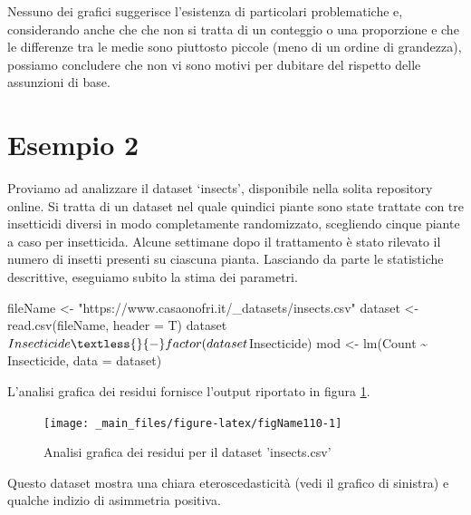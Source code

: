 \documentclass[a4paper,12pt,oneside]{book}
\newenvironment{Shaded}{\begin{snugshade}}{\end{snugshade}}
\newcommand{\SpecialCharTok}[1]{#1}
\newcommand{\StringTok}[1]{#1}
\newcommand{\OtherTok}[1]{#1}
\newcommand{\FunctionTok}[1]{#1}
\newcommand{\AttributeTok}[1]{#1}
\newcommand{\NormalTok}[1]{#1}
\begin{document}
Nessuno dei grafici suggerisce l'esistenza di particolari problematiche e, considerando anche che che non si tratta di un conteggio o una proporzione e che le differenze tra le medie sono piuttosto piccole (meno di un ordine di grandezza), possiamo concludere che non vi sono motivi per dubitare del rispetto delle assunzioni di base.

\hypertarget{esempio-2}{%
\section{Esempio 2}\label{esempio-2}}

Proviamo ad analizzare il dataset `insects', disponibile nella solita repository online. Si tratta di un dataset nel quale quindici piante sono state trattate con tre insetticidi diversi in modo completamente randomizzato, scegliendo cinque piante a caso per insetticida. Alcune settimane dopo il trattamento è stato rilevato il numero di insetti presenti su ciascuna pianta. Lasciando da parte le statistiche descrittive, eseguiamo subito la stima dei parametri.

\begin{Shaded}
\begin{Highlighting}[]
\NormalTok{fileName }\OtherTok{\textless{}{-}} \StringTok{"https://www.casaonofri.it/\_datasets/insects.csv"}
\NormalTok{dataset }\OtherTok{\textless{}{-}} \FunctionTok{read.csv}\NormalTok{(fileName, }\AttributeTok{header =}\NormalTok{ T)}
\NormalTok{dataset}\SpecialCharTok{$}\NormalTok{Insecticide }\OtherTok{\textless{}{-}} \FunctionTok{factor}\NormalTok{(dataset}\SpecialCharTok{$}\NormalTok{Insecticide)}
\NormalTok{mod }\OtherTok{\textless{}{-}} \FunctionTok{lm}\NormalTok{(Count }\SpecialCharTok{\textasciitilde{}}\NormalTok{ Insecticide, }\AttributeTok{data =}\NormalTok{ dataset)}
\end{Highlighting}
\end{Shaded}

L'analisi grafica dei residui fornisce l'output riportato in figura \ref{fig:figName110}.

\begin{figure}

{\centering \texttt{[image: \_main\_files/figure-latex/figName110-1]} 

}

\caption{Analisi grafica dei residui per il dataset 'insects.csv'}\label{fig:figName110}
\end{figure}

Questo dataset mostra una chiara eteroscedasticità (vedi il grafico di sinistra) e qualche indizio di asimmetria positiva.
\end{document}
